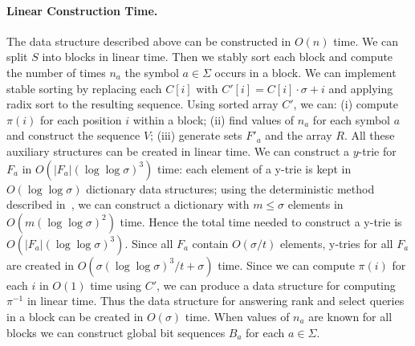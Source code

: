 \documentclass[11pt]{article}\usepackage{fullpage}
\begin{document}
\paragraph{Linear Construction Time.}
The data structure described above can be constructed in $O(n)$ time.  We can split $S$ into blocks in linear time. Then we stably sort each block and compute the number of times $n_a$ the symbol $a\in\Sigma$ occurs in a block. We can implement stable sorting by replacing each $C[i]$ with $C'[i]=C[i]\cdot \sigma+ i$ and applying radix sort to the resulting sequence. 
Using sorted array $C'$, we can: (i) compute $\pi(i)$ for each position $i$ within a block; (ii) find values of $n_a$ for each symbol $a$ and construct the sequence $V$; (iii) generate sets $F'_a$ and the array $R$. All these auxiliary structures can be created in linear time. 
We can construct a $y$-trie for $F_a$ in $O(|F_a|(\log\log \sigma)^3)$ time: 
each element of a y-trie is kept in $O(\log\log \sigma)$ dictionary data structures; using the deterministic method described in~\cite{Ruzic08}, we can construct a dictionary with $m\le \sigma$ elements in $O(m(\log\log\sigma)^2)$ time. 
Hence the total time needed to construct a y-trie is $O(|F_a|(\log\log\sigma)^3)$. Since all $F_a$ contain $O(\sigma/t)$ elements,
y-tries for all $F_a$ are created in $O(\sigma(\log\log \sigma)^3/t +\sigma)$ time.
Since we can compute $\pi(i)$ for each $i$ in $O(1)$ time using $C'$, we can produce a data structure for computing $\pi^{-1}$ in linear time. Thus the data structure for answering rank and select queries in a block can 
be created in $O(\sigma)$ time. When values of $n_a$ are known for all blocks we can  construct global bit sequences $B_a$ for each  $a\in \Sigma$. 
\end{document}
